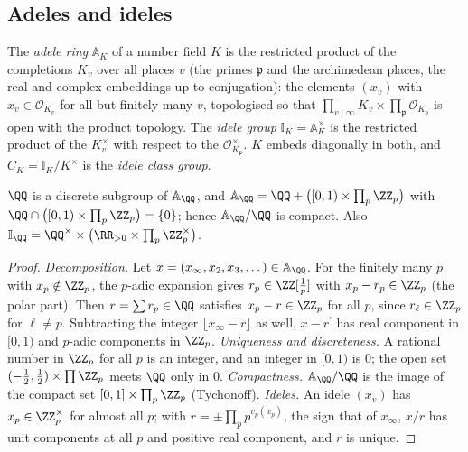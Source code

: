 \subsection{Adeles and ideles}\label{local-fields:subsection-adeles}

\begin{definition}\label{local-fields:definition-adeles}
The \emph{adele ring} $\mathbb{A}_K$ of a number field $K$ is the restricted product of the completions $K_v$ over all places $v$ (the primes $\mathfrak{p}$ and the archimedean places, the real and complex
embeddings up to conjugation): the elements $(x_v)$ with $x_v \in \mathcal{O}_{K_v}$ for all but finitely many $v$, topologised so that $\prod_{v \mid \infty}K_v \times \prod_{\mathfrak{p}}\mathcal{O}_{K_\mathfrak{p}}$
is open with the product topology. The \emph{idele group} $\mathbb{I}_K = \mathbb{A}_K^\times$ is the restricted product of the $K_v^\times$ with respect to the $\mathcal{O}_{K_\mathfrak{p}}^\times$. $K$ embeds
diagonally in both, and $C_K = \mathbb{I}_K/K^\times$ is the \emph{idele class group}.
\end{definition}

\begin{proposition}\label{local-fields:proposition-adeles-q}
$\QQ$ is a discrete subgroup of $\mathbb{A}_\QQ$, and $\mathbb{A}_\QQ = \QQ + \bigl([0, 1) \times \prod_p\ZZ_p\bigr)$ with $\QQ \cap \bigl([0, 1) \times \prod_p\ZZ_p\bigr) = \{0\}$; hence $\mathbb{A}_\QQ/\QQ$ is compact. Also
$\mathbb{I}_\QQ = \QQ^\times \times \bigl(\RR_{>0} \times \prod_p\ZZ_p^\times\bigr)$.
\end{proposition}

\begin{proof}
\emph{Decomposition.} Let $x = (x_\infty, x_2, x_3, \dots) \in \mathbb{A}_\QQ$. For the finitely many $p$ with $x_p \notin \ZZ_p$, the $p$-adic expansion gives $r_p \in \ZZ[\frac1p]$ with $x_p - r_p \in \ZZ_p$
(the polar part). Then $r = \sum r_p \in \QQ$ satisfies $x_p - r \in \ZZ_p$ for all $p$, since $r_\ell \in \ZZ_p$ for $\ell \neq p$. Subtracting the integer $\lfloor x_\infty - r\rfloor$ as well, $x - r^{\prime}$ has
real component in $[0, 1)$ and $p$-adic components in $\ZZ_p$. \emph{Uniqueness and discreteness.} A rational number in $\ZZ_p$ for all $p$ is an integer, and an integer in $[0, 1)$ is $0$; the open set
$(-\frac12, \frac12) \times \prod\ZZ_p$ meets $\QQ$ only in $0$. \emph{Compactness.} $\mathbb{A}_\QQ/\QQ$ is the image of the compact set $[0, 1] \times \prod_p\ZZ_p$ (Tychonoff). \emph{Ideles.} An idele $(x_v)$ has
$x_p \in \ZZ_p^\times$ for almost all $p$; with $r = \pm\prod_pp^{v_p(x_p)}$, the sign that of $x_\infty$, $x/r$ has unit components at all $p$ and positive real component, and $r$ is unique.
\end{proof}

